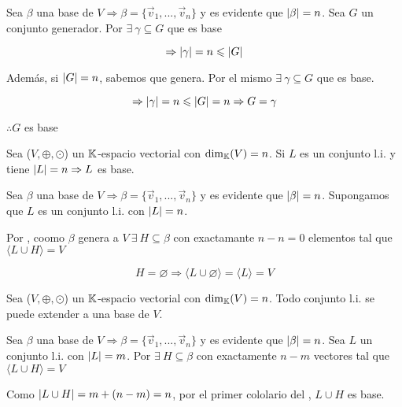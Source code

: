 \begin{orangeproof}
    Sea $\beta$ una base de $V \Rightarrow \beta = \{ \vec{v}_{1} , ... , \vec{v}_{n} \}$ y es evidente que $\abs{\beta} = n$. Sea $G$ un conjunto generador. Por  $\exists \: \gamma \subseteq G$ que es base

    $$\Rightarrow \abs{\gamma} = n \leqslant \abs{G}$$

    Además, si $\abs{G} = n$, sabemos que genera. Por el mismo  $\exists \: \gamma \subseteq G$ que es base.

    $$\Rightarrow \abs{\gamma} = n \leqslant \abs{G} = n \Rightarrow G = \gamma$$

    $\therefore G$ es base
\end{orangeproof}

\begin{corollary}
    Sea ($V, \oplus, \odot$) un $\mathbb{K}$-espacio vectorial con ${\dim}_{\mathbb{K}}(V) = n$. Si $L$ es un conjunto l.i. y tiene $\abs{L} = n \Rightarrow L$ es base.
\end{corollary}

\begin{orangeproof}
    Sea $\beta$ una base de $V \Rightarrow \beta = \{ \vec{v}_{1} , ... , \vec{v}_{n} \}$ y es evidente que $\abs{\beta} = n$. Supongamos que $L$ es un conjunto l.i. con $\abs{L} = n$.

    Por , coomo $\beta$ genera a $V \: \exists \: H \subseteq \beta$ con exactamante $n-n = 0$ elementos tal que $\langle L \cup H \rangle = V$

    $$ H = \varnothing \Rightarrow \langle L \cup \varnothing \rangle = \langle L \rangle = V $$
\end{orangeproof}

\begin{corollary}
    Sea ($V, \oplus, \odot$) un $\mathbb{K}$-espacio vectorial con ${\dim}_{\mathbb{K}}(V) = n$. Todo conjunto l.i. se puede extender a una base de $V$.
\end{corollary}

\begin{orangeproof}
    Sea $\beta$ una base de $V \Rightarrow \beta = \{ \vec{v}_{1} , ... , \vec{v}_{n} \}$ y es evidente que $\abs{\beta} = n$. Sea $L$ un conjunto l.i. con $\abs{L} = m$. Por  $\exists \: H \subseteq \beta$ con exactamente $n-m$ vectores tal que $\langle L \cup H \rangle = V$

    Como $\abs{L \cup H} = m + (n-m) = n$, por el primer cololario del , $L \cup H$ es base.
\end{orangeproof}

